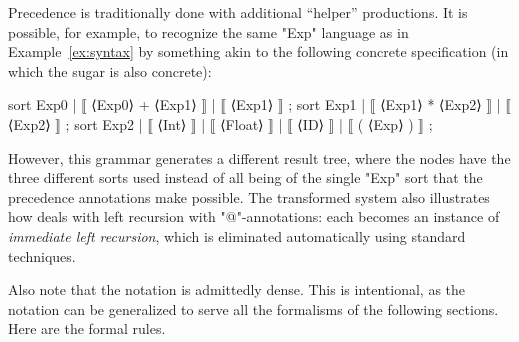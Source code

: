 \documentclass[11pt]{article} %
\begin{document}
\begin{remark} Precedence is traditionally done with additional ``helper'' productions. It is
    possible, for example, to recognize the same "Exp" language as in Example~\ref{ex:syntax} by
    something akin to the following concrete \HAX specification (in which the sugar is also
    concrete):
  \begin{hacs}[xleftmargin=\parindent]
sort Exp0 | ⟦ ⟨Exp0⟩ + ⟨Exp1⟩ ⟧ | ⟦ ⟨Exp1⟩ ⟧ ;
sort Exp1 | ⟦ ⟨Exp1⟩ * ⟨Exp2⟩ ⟧ | ⟦ ⟨Exp2⟩ ⟧ ;
sort Exp2 | ⟦ ⟨Int⟩ ⟧ | ⟦ ⟨Float⟩ ⟧ | ⟦ ⟨ID⟩ ⟧ | ⟦ ( ⟨Exp⟩ ) ⟧ ;
  \end{hacs}%
  However, this grammar generates a different result tree, where the nodes have the three different
  sorts used instead of all being of the single "Exp" sort that the precedence annotations make
  possible.  The transformed system also illustrates how \HAX deals with left recursion with
  "@"-annotations: each becomes an instance of \emph{immediate left recursion}, which is eliminated
  automatically using standard techniques.
\end{remark}

Also note that the notation is admittedly dense. This is intentional, as the notation can be
generalized to serve all the formalisms of the following sections.  Here are the formal rules.
\end{document}
